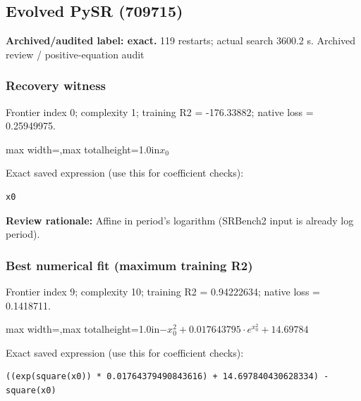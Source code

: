 \documentclass[10pt,letterpaper,landscape]{article}
\begin{document}
\begin{minipage}[t]{0.485\textwidth}
\subsection*{Evolved PySR (709715)}
\textbf{Archived/audited label: exact.} 119 restarts; actual search 3600.2 s.
{\small Archived review / positive-equation audit}
\subsubsection*{Recovery witness}
Frontier index 0; complexity 1; training R2 = -176.33882; native loss = 0.25949975.
\begin{center}\begin{adjustbox}{max width=\linewidth,max totalheight=1.0in}$\displaystyle x_{0}$\end{adjustbox}\end{center}
{\scriptsize Exact saved expression (use this for coefficient checks):}
\begin{lstlisting}
x0
\end{lstlisting}
{\small\textbf{Review rationale:} Affine in period's logarithm (SRBench2 input is already log period).}
\subsubsection*{Best numerical fit (maximum training R2)}
Frontier index 9; complexity 10; training R2 = 0.94222634; native loss = 0.1418711.
\begin{center}\begin{adjustbox}{max width=\linewidth,max totalheight=1.0in}$\displaystyle - x_{0}^{2} + 0.017643795 \cdot e^{x_{0}^{2}} + 14.69784$\end{adjustbox}\end{center}
{\scriptsize Exact saved expression (use this for coefficient checks):}
\begin{lstlisting}
((exp(square(x0)) * 0.01764379490843616) + 14.697840430628334) - square(x0)
\end{lstlisting}
\end{minipage}
\clearpage{}\label{leavitt-10009}
\end{document}
